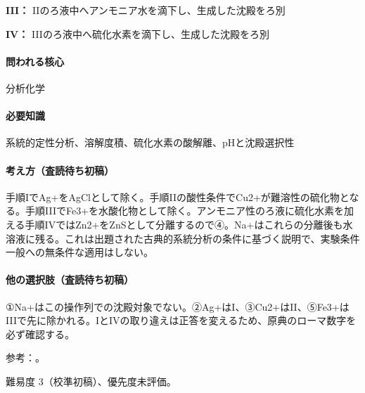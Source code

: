 \noindent\textbf{III：} IIのろ液中へアンモニア水を滴下し、生成した沈殿をろ別\par

\noindent\textbf{IV：} IIIのろ液中へ硫化水素を滴下し、生成した沈殿をろ別\par

\paragraph{問われる核心} 分析化学

\paragraph{必要知識} 系統的定性分析、溶解度積、硫化水素の酸解離、pHと沈殿選択性

\paragraph{考え方（査読待ち初稿）} 手順IでAg+をAgClとして除く。手順IIの酸性条件でCu2+が難溶性の硫化物となる。手順IIIでFe3+を水酸化物として除く。アンモニア性のろ液に硫化水素を加える手順IVではZn2+をZnSとして分離するので④。Na+はこれらの分離後も水溶液に残る。これは出題された古典的系統分析の条件に基づく説明で、実験条件一般への無条件な適用はしない。

\paragraph{他の選択肢（査読待ち初稿）} ①Na+はこの操作列での沈殿対象でない。②Ag+はI、③Cu2+はII、⑤Fe3+はIIIで先に除かれる。IとIVの取り違えは正答を変えるため、原典のローマ数字を必ず確認する。

\par 参考：\cite{qualitative_stanford}。

\par 難易度 3（校準初稿）、優先度未評価。
